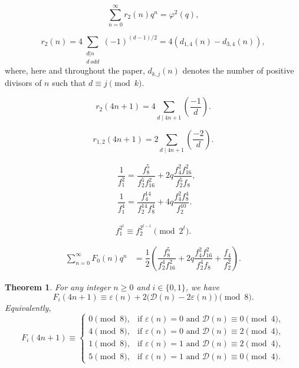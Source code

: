 \documentclass[10pt,a4paper]{amsart}
\newtheorem{theorem}{Theorem}
\begin{document}
\begin{equation}\label{gp}
	\sum_{n=0}^\infty r_2(n)q^n=\varphi^2(q),
	\end{equation}

\begin{equation}\label{r_2}
    r_2(n)=4\sum_{\substack{d|n\\d ~odd}}(-1)^{(d-1)/2}=4(d_{1,4}(n)-d_{3,4}(n)),
\end{equation} where, here and throughout the paper, $d_{k,j}(n)$ denotes the number of positive divisors of $n$ such that $d\equiv j\pmod k$.

\begin{equation}\label{r_2.4n+1}
r_2(4n+1)=4\sum_{d\mid 4n+1}\left(\dfrac{-1}{d}\right).
\end{equation}

\begin{equation}\label{B3}
r_{1,2}(4n+1)=2\sum_{d\mid 4n+1}\left(\dfrac{-2}{d}\right).
\end{equation}

   \begin{align}
&\label{P6}\dfrac{1}{f_1^2}
=
\dfrac{f_8^5}{f_2^5f_{16}^2}
+
2q\dfrac{f_4^2f_{16}^2}{f_2^5f_8},\\
&\label{P7}\dfrac{1}{f_1^4}
=
\dfrac{f_4^{14}}{f_2^{14}f_8^4}
+
4q\dfrac{f_4^2f_8^4}{f_2^{10}}.
\end{align}

\begin{equation}\label{2t}
    f_1^{2^t}\equiv f_{2}^{2^{t-1}}\pmod{2^t}. 
\end{equation}   

\begin{align}
\sum_{n=0}^{\infty}F_0(n)q^n
&=
\dfrac{1}{2}
\left(
\dfrac{f_8^5}{f_2^4f_{16}^2}
+
2q\dfrac{f_4^2f_{16}^2}{f_2^4f_8}
+
\dfrac{f_4}{f_2^2}
\right).
\label{A14f0}
\end{align}

\begin{theorem}
For any integer $n\ge 0$ and  $i\in\{0,1\}$, we have 
\begin{equation}\label{fg3}
F_i(4n+1)\equiv
\varepsilon(n)+2\bigl(\mathcal{D}(n)-2\varepsilon(n)\bigr)
\pmod 8.
\end{equation}
Equivalently,
\begin{equation}\label{fg4}
F_i(4n+1)\equiv
\begin{cases}
0 \pmod 8, & \text{if } \varepsilon(n)=0 \text{ and } \mathcal{D}(n)\equiv0\pmod4,\\
4 \pmod 8, & \text{if } \varepsilon(n)=0 \text{ and } \mathcal{D}(n)\equiv2\pmod4,\\
1 \pmod 8, & \text{if } \varepsilon(n)=1 \text{ and } \mathcal{D}(n)\equiv2\pmod4,\\
5 \pmod 8, & \text{if } \varepsilon(n)=1 \text{ and } \mathcal{D}(n)\equiv0\pmod4.
\end{cases}
\end{equation}
\end{theorem}
\end{document}
